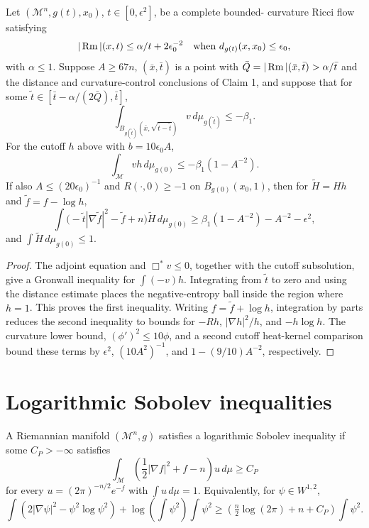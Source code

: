 \begin{lemma}
\label{lem:chow-iii-local-entropy-upper-bound}
Let \((\mathcal M^n,g(t),x_0)\), \(t\in[0,\epsilon^2]\), be a complete bounded-
curvature Ricci flow satisfying
\[
 |\operatorname{Rm}|(x,t)\le\alpha/t+2\epsilon_0^{-2}
\quad\text{when }d_{g(t)}(x,x_0)\le\epsilon_0,
\]
with \(\alpha\le1\).  Suppose \(A\ge67n\), \((\bar x,\bar t)\) is a point
with \(\bar Q=|\operatorname{Rm}|(\bar x,\bar t)>\alpha/\bar t\) and the distance and
curvature-control conclusions of Claim 1, and suppose that for some
\(\tilde t\in[\bar t-\alpha/(2\bar Q),\bar t]\),
\[
 \int_{B_{g(\tilde t)}(\bar x,\sqrt{\bar t-\tilde t})}v\,d\mu_{g(\tilde t)}\le-\beta_1.
\]
For the cutoff \(h\) above with \(b=10\epsilon_0A\),
\[
 \int_{\mathcal M}v h\,d\mu_{g(0)}
 \le-\beta_1(1-A^{-2}).
\]
If also \(A\le(20\epsilon_0)^{-1}\) and \(R(\cdot,0)\ge-1\) on
\(B_{g(0)}(x_0,1)\), then for \(\widetilde H=Hh\) and
\(\widetilde f=f-\log h\),
\[
 \int\bigl(-\tilde t|\nabla\widetilde f|^2-\widetilde f+n\bigr)\widetilde H\,d\mu_{g(0)}
 \ge \beta_1(1-A^{-2})-A^{-2}-\epsilon^2,
\]
and \(\int\widetilde H\,d\mu_{g(0)}\le1\).
\end{lemma}
\begin{proof}
The adjoint equation and \(\Box^*v\le0\), together with the cutoff
subsolution, give a Gronwall inequality for \(\int(-v)h\).  Integrating from
\(\tilde t\) to zero and using the distance estimate places the negative-entropy
ball inside the region where \(h=1\).  This proves the first inequality.  Writing
\(f=\widetilde f+\log h\), integration by parts reduces the second inequality
to bounds for \(-Rh\), \(|\nabla h|^2/h\), and \(-h\log h\).  The curvature lower bound,
\((\phi')^2\le10\phi\), and a second cutoff heat-kernel comparison bound these
terms by \(\epsilon^2\), \((10A^2)^{-1}\), and \(1-(9/10)A^{-2}\), respectively.
\end{proof}

\section{Logarithmic Sobolev inequalities}

\begin{definition}
\label{def:chow-iii-log-sobolev}
A Riemannian manifold \((\mathcal M^n,g)\) satisfies a logarithmic Sobolev
inequality if some \(C_P>-\infty\) satisfies
\[
 \int_{\mathcal M}\left(\frac12|\nabla f|^2+f-n\right)u\,d\mu\ge C_P
\]
for every \(u=(2\pi)^{-n/2}e^{-f}\) with \(\int u\,d\mu=1\).  Equivalently,
for \(\psi\in W^{1,2}\),
\[
 \int(2|\nabla\psi|^2-\psi^2\log\psi^2)
 +\log\!\left(\int\psi^2\right)\int\psi^2
 \ge\left(\tfrac n2\log(2\pi)+n+C_P\right)\int\psi^2.
\]
\end{definition}

